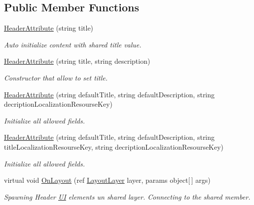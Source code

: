 \subsection*{Public Member Functions}
\begin{DoxyCompactItemize}
\item 
\mbox{\hyperlink{class_wpf_handler_1_1_u_i_1_1_auto_layout_1_1_controls_1_1_header_attribute_a0c0c74638fa9192803be651427641a7c}{Header\+Attribute}} (string title)
\begin{DoxyCompactList}\small\item\em Auto initialize content with shared title value. \end{DoxyCompactList}\item 
\mbox{\hyperlink{class_wpf_handler_1_1_u_i_1_1_auto_layout_1_1_controls_1_1_header_attribute_aa89774276da07f96c045d13506488df3}{Header\+Attribute}} (string title, string description)
\begin{DoxyCompactList}\small\item\em Constructor that allow to set title. \end{DoxyCompactList}\item 
\mbox{\hyperlink{class_wpf_handler_1_1_u_i_1_1_auto_layout_1_1_controls_1_1_header_attribute_ac3e75023735c59f6cb90a2f117c02427}{Header\+Attribute}} (string default\+Title, string default\+Description, string decription\+Localization\+Resourse\+Key)
\begin{DoxyCompactList}\small\item\em Initialize all allowed fields. \end{DoxyCompactList}\item 
\mbox{\hyperlink{class_wpf_handler_1_1_u_i_1_1_auto_layout_1_1_controls_1_1_header_attribute_a0ababe608741f8a08b2bcb9a31c32911}{Header\+Attribute}} (string default\+Title, string default\+Description, string title\+Localization\+Resourse\+Key, string decription\+Localization\+Resourse\+Key)
\begin{DoxyCompactList}\small\item\em Initialize all allowed fields. \end{DoxyCompactList}\item 
virtual void \mbox{\hyperlink{class_wpf_handler_1_1_u_i_1_1_auto_layout_1_1_controls_1_1_header_attribute_a837805f9b975447e7cf5663119189c37}{On\+Layout}} (ref \mbox{\hyperlink{class_wpf_handler_1_1_u_i_1_1_auto_layout_1_1_layout_layer}{Layout\+Layer}} layer, params object\mbox{[}$\,$\mbox{]} args)
\begin{DoxyCompactList}\small\item\em Spawning Header \mbox{\hyperlink{namespace_wpf_handler_1_1_u_i}{UI}} elements un shared layer. Connecting to the shared member. \end{DoxyCompactList}\item 

\end{DoxyCompactItemize}
